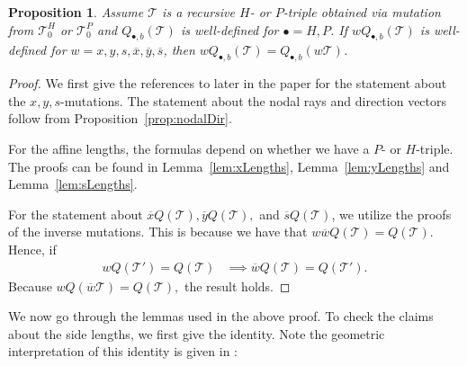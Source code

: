 \documentclass[11pt, reqno]{amsart}
\newtheorem{prop}[thm]{Proposition}
\theoremstyle{remark}
\numberwithin{equation}{subsection}
\numberwithin{figure}{section}
\theoremstyle{customremark}
\newcommand{\Tt}{\mathcal{T}}
\newcommand{\ov}{\overline}
\begin{document}
\begin{prop} \label{prop:ATFMut}
    Assume $\Tt$ is a recursive $H$- or $P$-triple obtained via mutation from $\Tt_0^H$ or $\Tt_0^P$ and $Q_{\bullet,b}(\Tt)$ is well-defined for $\bullet=H,P$. If $wQ_{\bullet,b}(\Tt)$ is well-defined for $w=x,y,s,\ov{x},\ov{y},\ov{s}$, then
     $wQ_{\bullet,b}(\Tt)=Q_{\bullet,b}(w\Tt)$. 
\end{prop}
\begin{proof}
    We first give the references to later in the paper for the statement about the $x,y,s$-mutations. The statement about the nodal rays and direction vectors follow from Proposition~\ref{prop:nodalDir}.
  

    For the affine lengths, the formulas depend on whether we have a $P$- or $H$-triple. The proofs can be found in Lemma~\ref{lem:xLengths}, Lemma~\ref{lem:yLengths} and Lemma~\ref{lem:sLengths}. 
  

    
    For the statement about $\ov{x}Q(\Tt),\ov{y}Q(\Tt),$ and $\ov{s}Q(\Tt)$, we utilize the proofs of the inverse mutations. This is because we have that 
    $w\ov{w}Q(\Tt)=Q(\Tt)$. Hence, if
    \begin{align*} wQ(\Tt')=Q(\Tt) &\implies \ov{w}Q(\Tt)=Q(\Tt').
    \end{align*}
    Because $wQ(\ov{w}\Tt)=Q(\Tt),$ the result holds. 
\end{proof}

We now go through the lemmas used in the above proof. To check the claims about the side lengths, we first give the identity. Note the geometric interpretation of this identity is given in \cite[Remark 6.4]{M1}:
\end{document}
